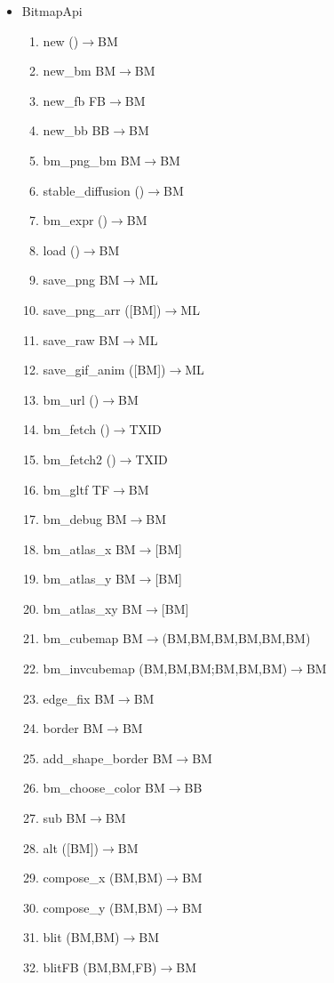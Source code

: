 \documentclass[11pt,twoside,a4paper]{article}
\begin{document}
\begin{itemize}
  \item BitmapApi
\begin{enumerate}
\item new ()$\rightarrow$BM
\item new\_bm BM$\rightarrow$BM
\item new\_fb FB$\rightarrow$BM
\item new\_bb BB$\rightarrow$BM
\item bm\_png\_bm BM$\rightarrow$BM
\item stable\_diffusion ()$\rightarrow$BM
\item bm\_expr ()$\rightarrow$BM
\item load ()$\rightarrow$BM
\item save\_png BM$\rightarrow$ML
\item save\_png\_arr ([BM])$\rightarrow$ML
\item save\_raw BM$\rightarrow$ML 
\item save\_gif\_anim ([BM])$\rightarrow$ML
\item bm\_url ()$\rightarrow$BM
\item bm\_fetch ()$\rightarrow$TXID
\item bm\_fetch2 ()$\rightarrow$TXID
\item bm\_gltf TF$\rightarrow$BM
\item bm\_debug BM$\rightarrow$BM
\item bm\_atlas\_x BM$\rightarrow$[BM]
\item bm\_atlas\_y BM$\rightarrow$[BM]
\item bm\_atlas\_xy BM$\rightarrow$[BM]
\item bm\_cubemap BM$\rightarrow$(BM,BM,BM,BM,BM,BM)
\item bm\_invcubemap (BM,BM,BM;BM,BM,BM)$\rightarrow$BM
\item edge\_fix BM$\rightarrow$BM
\item border BM$\rightarrow$BM 
\item add\_shape\_border BM$\rightarrow$BM
\item bm\_choose\_color BM$\rightarrow$BB
\item sub BM$\rightarrow$BM
\item alt ([BM])$\rightarrow$BM
\item compose\_x (BM,BM)$\rightarrow$BM
\item compose\_y (BM,BM)$\rightarrow$BM
\item blit (BM,BM)$\rightarrow$BM
\item blitFB (BM,BM,FB)$\rightarrow$BM

\end{enumerate}
\end{itemize}
\end{document}
